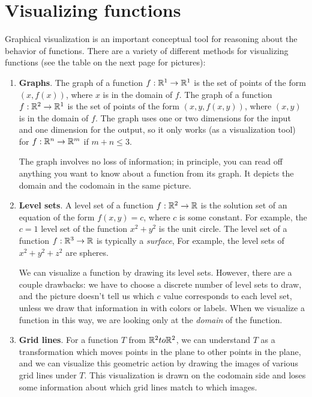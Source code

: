 \documentclass[svgnames]{report}
\begin{document}
\newpage

\section{Visualizing functions}

  Graphical visualization is an important conceptual tool for reasoning
  about the behavior of functions. There are a variety of different
  methods for visualizing functions (see the table on the next page
  for pictures):

  \begin{tcolorbox}[title = Function Visualization Methods, colback =
    softblue, colframe = MidnightBlue] 
  \begin{enumerate}[leftmargin = 12pt, itemsep = 6pt, parsep = 6pt]
  \item \textbf{Graphs}. The graph of a function $f : \mathbb{R}^1 \to \mathbb{R}^1$ is
    the set of points of the form $(x,f(x))$, where $x$ is in the
    domain of $f$. The graph of a function $f : \mathbb{R}^2 \to \mathbb{R}^1$ is
    the set of points of the form $(x,y,f(x,y))$, where $(x,y)$ is in the
    domain of $f$. The graph uses one or two dimensions for the input
    and one dimension for the output, so it only works (as a
    visualization tool) for $f : \mathbb{R}^n \to \mathbb{R}^m$ if $m + n \leq 3$.

    The graph involves no loss of information; in principle, you can
    read off anything you want to know about a function from its
    graph. It depicts the domain and the codomain in the same picture. 
    
  \item \textbf{Level sets}. A level set of a function $f:\mathbb{R}^2 \to \mathbb{R}$
    is the solution set of an equation of the form $f(x,y) = c$, where
    $c$ is some constant. For example, the $c=1$ level set of the
    function $x^2 + y^2$ is the unit circle. The level set of a
    function $f:\mathbb{R}^3 \to \mathbb{R}$ is typically a \textit{surface}, For
    example, the level sets of $x^2 + y^2 + z^2$ are spheres.

    We can visualize a function by drawing its level sets. However,
    there are a couple drawbacks: we have to choose a discrete number
    of level sets to draw, and the picture doesn't tell us which $c$
    value corresponds to each level set, unless we draw that
    information in with colors or labels. When we visualize a function
    in this way, we are looking only at the \textit{domain} of the
    function. 

  \item \textbf{Grid lines}. For a function $T$ from $\mathbb{R}^2 to \mathbb{R}^2$, we can
    understand $T$ as a transformation which moves points in the plane
    to other points in the plane, and we can visualize this geometric
    action by drawing the images of various grid lines under $T$. This
    visualization is drawn on the codomain side and loses some
    information about which grid lines match to which images. 
    

\end{enumerate}
\end{tcolorbox}
\end{document}

